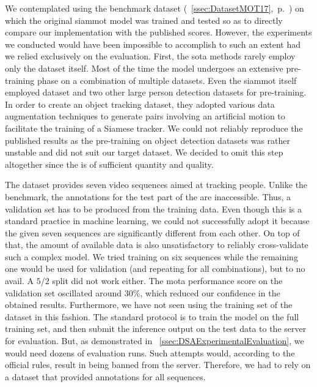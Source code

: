 We contemplated using the \motseventeen{} benchmark dataset (\sectiontext{}~\ref{ssec:DatasetMOT17},~p.~\pageref{ssec:DatasetMOT17}) on which the original \gls{siammot} model was trained and tested so as to directly compare our implementation with the published scores. However, the experiments we conducted would have been impossible to accomplish to such an extent had we relied exclusively on the \motseventeen{} evaluation. First, the \gls{sota} methods rarely employ only the \motseventeen{} dataset itself. Most of the time the model undergoes an extensive pre-training phase on a combination of multiple datasets. Even the \gls{siammot} itself employed \mscoco{} dataset and two other large person detection datasets for pre-training. In order to create an object tracking dataset, they adopted various data augmentation techniques to generate pairs involving an artificial motion to facilitate the training of a Siamese tracker. We could not reliably reproduce the published results as the pre-training on object detection datasets was rather unstable and did not suit our target dataset. We decided to omit this step altogether since the \uadetrac{} is of sufficient quantity and quality.

The \motseventeen{} dataset provides seven video sequences aimed at tracking people. Unlike the \uadetrac{} benchmark, the annotations for the test part of the \motseventeen{} are inaccessible. Thus, a validation set has to be produced from the training data. Even though this is a standard practice in machine learning, we could not successfully adopt it because the given seven sequences are significantly different from each other. On top of that, the amount of available data is also unsatisfactory to reliably cross-validate such a complex model. We tried training on six sequences while the remaining one would be used for validation (and repeating for all combinations), but to no avail. A $5$/$2$ split did not work either. The \gls{mota} performance score on the validation set oscillated around $30$\%, which reduced our confidence in the obtained results. Furthermore, we have not seen using the training set of the \motseventeen{} dataset in this fashion. The standard protocol is to train the model on the full training set, and then submit the inference output on the test data to the server for evaluation. But, as demonstrated in \sectiontext{}~\ref{ssec:DSAExperimentalEvaluation}, we would need dozens of evaluation runs. Such attempts would, according to the official rules, result in being banned from the server. Therefore, we had to rely on a dataset that provided annotations for all sequences.

